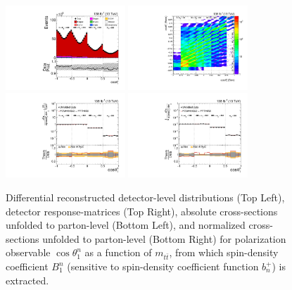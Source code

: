 \clearpage
\begin{figure}[htb]
\begin{center}
 \includegraphics[width=0.40\textwidth]{fig_fullRun2UL/controlplots/combined/Hyp_AntiLeptonBn_vs_TTBarMass.pdf}
 \includegraphics[width=0.40\textwidth]{fig_fullRun2UL/unfolding/combined/ResponseMatrix_b1n_mttbar.pdf} \\
 \includegraphics[width=0.40\textwidth]{fig_fullRun2UL/unfolding/combined/UnfoldedResults_b1n_mttbar.pdf}
 \includegraphics[width=0.40\textwidth]{fig_fullRun2UL/unfolding/combined/UnfoldedResultsNorm_b1n_mttbar.pdf} \\
\label{fig:b1n_mttbar}
\caption{Differential reconstructed detector-level distributions (Top Left), detector response-matrices (Top Right), absolute cross-sections unfolded to parton-level (Bottom Left), and normalized cross-sections unfolded to parton-level (Bottom Right) for polarization observable $\cos\theta_{1}^{n}$ as a function of $m_{t\bar{t}}$, from which spin-density coefficient $B_{1}^{n}$ (sensitive to spin-density coefficient function $b_n^{+}$) is extracted.}
\end{center}
\end{figure}
